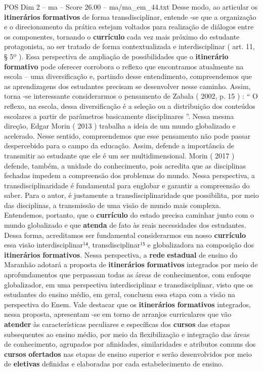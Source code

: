 \begin{textsample}{POS Dim 2 – ma – Score 26.00 – ma/ma\_em\_44.txt}
Desse modo, ao articular os \textbf{itinerários} \textbf{formativos} de forma transdisciplinar, entende -se que a organização e o direcionamento da prática estejam voltados para realização de diálogos entre os componentes, tornando o \textbf{currículo} cada vez mais próximo do estudante protagonista, ao ser tratado de forma contextualizada e interdisciplinar ( art. 11, § 5º ).
Essa perspectiva de ampliação de possibilidades que o \textbf{itinerário} \textbf{formativo} pode oferecer corrobora o reflexo que encontramos atualmente na escola – uma diversificação e, partindo desse entendimento, compreendemos que as aprendizagens dos estudantes precisam se desenvolver nesse caminho.
Assim, torna -se interessante considerarmos o pensamento de Zabala ( 2002, p. 15 ) : “ O reflexo, na escola, dessa diversificação é a seleção ou a distribuição dos conteúdos escolares a partir de parâmetros basicamente disciplinares ”.
Nessa mesma direção, Edgar Morin ( 2013 ) trabalha a ideia de um mundo globalizado e acelerado.
Nesse sentido, compreendemos que esse pensamento não pode passar despercebido para o campo da educação.
Assim, defende a importância de transmitir ao estudante que ele é um ser multidimensional.
Morin ( 2017 ) defende, também, a unidade do conhecimento, pois acredita que as disciplinas fechadas impedem a compreensão dos problemas do mundo.
Nessa perspectiva, a transdisciplinaridade é fundamental para englobar e garantir a compreensão do saber.
Para o autor, é justamente a transdisciplinaridade que possibilita, por meio das disciplinas, a transmissão de uma visão de mundo mais complexa.
Entendemos, portanto, que o \textbf{currículo} do estado precisa caminhar junto com o mundo globalizado e que \textbf{atenda} de fato às reais necessidades dos estudantes.
Dessa forma, acreditamos ser fundamental considerarmos em nosso \textbf{currículo} essa visão interdisciplinar¹⁴, transdisciplinar¹⁵ e globalizadora na composição dos \textbf{itinerários} \textbf{formativos}.
Nessa perspectiva, a \textbf{rede} \textbf{estadual} de ensino do Maranhão adotará a proposta de \textbf{itinerários} \textbf{formativos} integrados por meio de aprofundamentos que perpassam todas as áreas de conhecimentos, com enfoque globalizador, em uma perspectiva interdisciplinar e transdisciplinar, visto que os estudantes do ensino médio, em geral, concluem essa etapa com a visão na perspectiva do Enem.
Vale destacar que os \textbf{itinerários} \textbf{formativos} integrados, nessa proposta, apresentam -se em torno de arranjos curriculares que vão \textbf{atender} às características peculiares e específicas dos \textbf{cursos} das etapas subsequentes ao ensino médio, por meio da flexibilização e integração das áreas de conhecimento, agrupados por afinidades, similaridades e atributos comuns dos \textbf{cursos} \textbf{ofertados} nas etapas de ensino superior e serão desenvolvidos por meio de \textbf{eletivas} definidas e elaboradas por cada estabelecimento de ensino.

\end{textsample}
